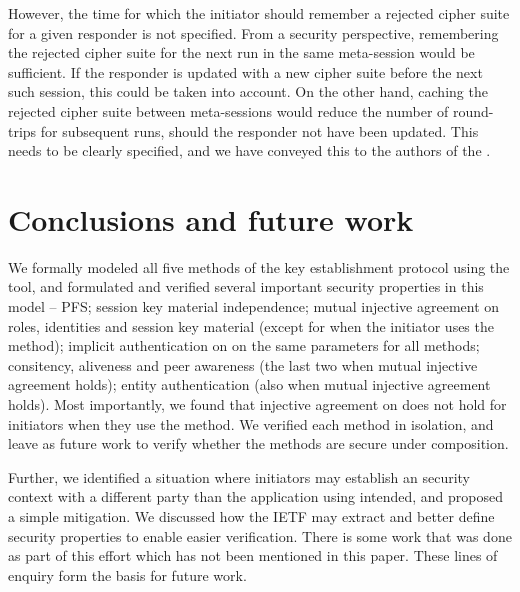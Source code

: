 \documentclass[runningheads, envcountsame, hidelinks, a4paper, x11names]{article}
\begin{document}
However, the time for which the initiator should
remember a rejected cipher suite for a given responder is not specified.
%
From a security perspective, remembering the rejected cipher suite for the
next \mEdhoc{} run in the same meta-session would be sufficient.
%
If the responder is updated with a new cipher suite before the next such
session, this could be taken into account. On the other hand, caching the
rejected cipher suite between meta-sessions would reduce the number of
round-trips for subsequent runs, should the responder not have been updated.
%
This needs to be clearly specified, and we have conveyed this to the authors
of the \mSpec.
%

\section{Conclusions and future work}
\label{sec:conclusions}
We formally modeled all five
methods of the \mEdhoc{} key establishment protocol using the \mTamarin{} tool, and
formulated and verified several important security properties in this model --
PFS; session key material independence; mutual injective agreement on roles, identities and session key material
(except for when the initiator uses the \mStat{} method); implicit
authentication on on the same parameters for all methods; consitency, aliveness
and peer awareness (the last two when mutual injective agreement holds);
entity authentication (also when mutual injective agreement holds).
%
Most importantly, we found that injective agreement on \mGiy{} does not hold for
initiators when they use the \mStat{} method.
%
We verified each method in isolation, and leave as future work to verify whether
the methods are secure under composition.
%

Further, we identified a situation where initiators may establish an \mOscore{}
security context with a different party than the application using \mEdhoc{}
intended, and proposed a simple mitigation.
%
We discussed how the IETF may extract and better define security properties to
enable easier verification.
%
There is some work that was done as part of this effort which has not been mentioned in this paper. These lines of enquiry form the basis for future work.
\end{document}
